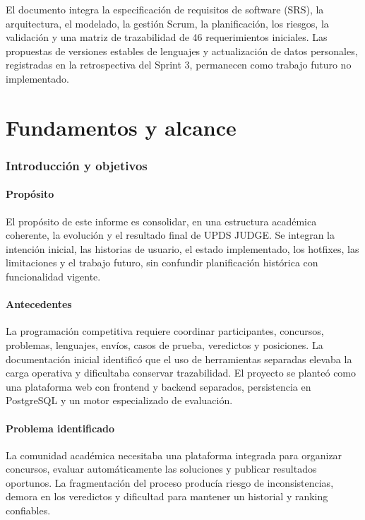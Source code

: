 \documentclass[11pt,a4paper]{article}
\begin{document}
El documento integra la especificación de requisitos de software (SRS), la arquitectura, el modelado, la gestión Scrum, la planificación, los riesgos, la validación y una matriz de trazabilidad de 46 requerimientos iniciales. Las propuestas de versiones estables de lenguajes y actualización de datos personales, registradas en la retrospectiva del Sprint 3, permanecen como trabajo futuro no implementado.

\clearpage
\tableofcontents
\clearpage
\listoffigures
{}
\clearpage
\listoftables
{}
\clearpage
{}

\part{Fundamentos y alcance}

\section{Introducción y objetivos}
\label{sec:introduccion}

\subsection{Propósito}
El propósito de este informe es consolidar, en una estructura académica coherente, la evolución y el resultado final de UPDS JUDGE. Se integran la intención inicial, las historias de usuario, el estado implementado, los hotfixes, las limitaciones y el trabajo futuro, sin confundir planificación histórica con funcionalidad vigente.

\subsection{Antecedentes}
La programación competitiva requiere coordinar participantes, concursos, problemas, lenguajes, envíos, casos de prueba, veredictos y posiciones. La documentación inicial identificó que el uso de herramientas separadas elevaba la carga operativa y dificultaba conservar trazabilidad. El proyecto se planteó como una plataforma web con frontend y backend separados, persistencia en PostgreSQL y un motor especializado de evaluación.

\subsection{Problema identificado}
La comunidad académica necesitaba una plataforma integrada para organizar concursos, evaluar automáticamente las soluciones y publicar resultados oportunos. La fragmentación del proceso producía riesgo de inconsistencias, demora en los veredictos y dificultad para mantener un historial y ranking confiables.
\end{document}
